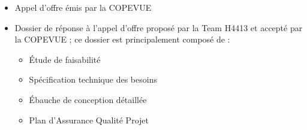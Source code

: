 \begin{itemize}
\item Appel d'offre émis par la COPEVUE
\item Dossier de réponse à l'appel d'offre proposé par la Team H4413 et
accepté par la COPEVUE ; ce dossier est principalement composé de :
    \begin{itemize}
    \item Étude de faisabilité
    \item Spécification technique des besoins
    \item Ébauche de conception détaillée
    \item Plan d'Assurance Qualité Projet
    \end{itemize}
\end{itemize}


